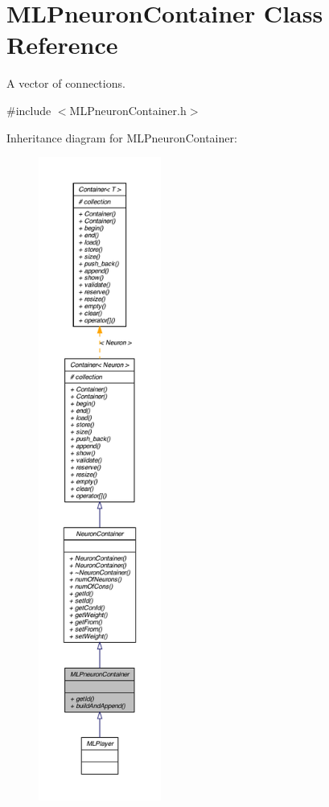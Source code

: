 \hypertarget{class_m_l_pneuron_container}{
\section{MLPneuronContainer Class Reference}
\label{class_m_l_pneuron_container}
}


A vector of connections.  




{\ttfamily \#include $<$MLPneuronContainer.h$>$}



Inheritance diagram for MLPneuronContainer:\nopagebreak
\begin{figure}[H]
\begin{center}
\leavevmode
\includegraphics[height=600pt]{class_m_l_pneuron_container__inherit__graph}
\end{center}
\end{figure}


